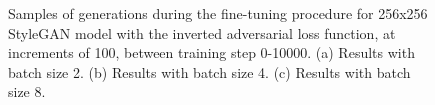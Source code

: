 \label{c4:sec:og-loss}
\begin{figure}[!htbp]
    \centering
    \hfill
    \hfill
    \caption[Samples of generations during the fine-tuning procedure for 256x256 StyleGAN model with the inverted adversarial loss function]{Samples of generations during the fine-tuning procedure for 256x256 StyleGAN model with the inverted adversarial loss function, at increments of 100, between training step 0-10000. (a) Results with batch size 2. (b) Results with batch size 4. (c) Results with batch size 8.}
    \label{fig:c4:256-OG-samples}
  \end{figure}

